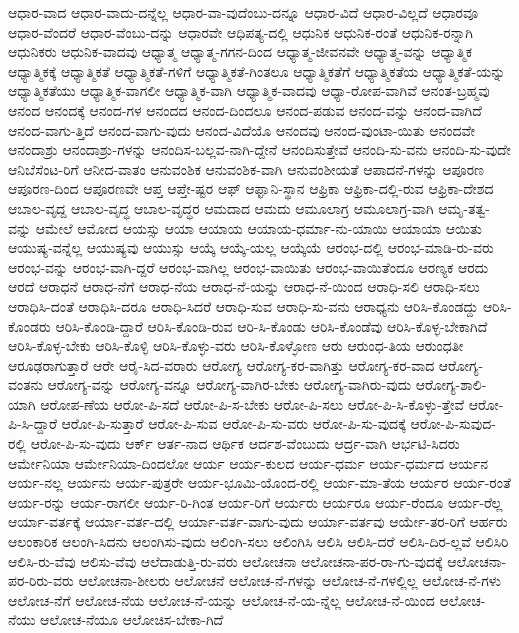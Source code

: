 {ಆಧಾರ-ವಾದ
ಆಧಾರ-ವಾದು-ದನ್ನೆಲ್ಲ
ಆಧಾರ-ವಾ-ವುದೆಂಬು-ದನ್ನೂ
ಆಧಾರ-ವಿದೆ
ಆಧಾರ-ವಿಲ್ಲದೆ
ಆಧಾರವೂ
ಆಧಾರ-ವೆಂದರೆ
ಆಧಾರ-ವೆಂಬು-ದನ್ನು
ಆಧಾರವೇ
ಆಧಿಪತ್ಯ-ದಲ್ಲಿ
ಆಧುನಿಕ
ಆಧುನಿಕ-ರಂತೆ
ಆಧುನಿಕ-ರನ್ನಾಗಿ
ಆಧುನಿಕರು
ಆಧುನಿಕ-ವಾದವು
ಆಧ್ಯಾತ್ಮ
ಆಧ್ಯಾತ್ಮ-ಗಗನ-ದಿಂದ
ಆಧ್ಯಾತ್ಮ-ಜೀವನವೇ
ಆಧ್ಯಾತ್ಮ-ವನ್ನು
ಆಧ್ಯಾತ್ಮಿಕ
ಆಧ್ಯಾತ್ಮಿಕಕ್ಕೆ
ಆಧ್ಯಾತ್ಮಿಕತೆ
ಆಧ್ಯಾತ್ಮಿಕತೆ-ಗಳಿಗೆ
ಆಧ್ಯಾತ್ಮಿಕತೆ-ಗಿಂತಲೂ
ಆಧ್ಯಾತ್ಮಿಕತೆಗೆ
ಆಧ್ಯಾತ್ಮಿಕತೆಯ
ಆಧ್ಯಾತ್ಮಿಕತೆ-ಯನ್ನು
ಆಧ್ಯಾತ್ಮಿಕತೆಯು
ಆಧ್ಯಾತ್ಮಿಕ-ವಾಗಲೀ
ಆಧ್ಯಾತ್ಮಿಕ-ವಾಗಿ
ಆಧ್ಯಾತ್ಮಿಕ-ವಾದವು
ಆಧ್ಯಾ-ರೋಪ-ವಾಗಿವೆ
ಆನಂತ-ಬ್ರಹ್ಮವು
ಆನಂದ
ಆನಂದಕ್ಕೆ
ಆನಂದ-ಗಳ
ಆನಂದದ
ಆನಂದ-ದಿಂದಲೂ
ಆನಂದ-ಪಡುವ
ಆನಂದ-ವನ್ನು
ಆನಂದ-ವಾಗಿದೆ
ಆನಂದ-ವಾಗು-ತ್ತಿದೆ
ಆನಂದ-ವಾಗು-ವುದು
ಆನಂದ-ವಿದೆಯೊ
ಆನಂದವು
ಆನಂದ-ವುಂಟಾ-ಯಿತು
ಆನಂದವೇ
ಆನಂದಾಶ್ರು
ಆನಂದಾಶ್ರು-ಗಳನ್ನು
ಆನಂದಿಸ-ಬಲ್ಲವ-ನಾಗಿ-ದ್ದೇನೆ
ಆನಂದಿಸುತ್ತೇವೆ
ಆನಂದಿ-ಸು-ವನು
ಆನಂದಿ-ಸು-ವುದೇ
ಆನಿಬೆಸೆಂಟ-ರಿಗೆ
ಆನೀದ-ವಾತಂ
ಆನುವಂಶಿಕ
ಆನುವಂಶಿಕ-ವಾಗಿ
ಆನುವಂಶೀಯತೆ
ಆಪಾದನೆ-ಗಳನ್ನು
ಆಪೂರಣ
ಆಪೂರಣ-ದಿಂದ
ಆಪೂರಣವೇ
ಆಪ್ತ
ಆಪ್ತೇ-ಷ್ಟರ
ಆಫ್
ಆಫ್ಘಾನಿ-ಸ್ಥಾನ
ಆಫ್ರಿಕಾ
ಆಫ್ರಿಕಾ-ದಲ್ಲಿ-ರುವ
ಆಫ್ರಿಕಾ-ದೇಶದ
ಆಬಾಲ-ವೃದ್ದ
ಆಬಾಲ-ವೃದ್ಧ
ಆಬಾಲ-ವೃದ್ಧರ
ಆಮದಾದ
ಆಮದು
ಆಮೂಲಾಗ್ರ
ಆಮೂಲಾಗ್ರ-ವಾಗಿ
ಆಮೃ-ತತ್ವ-ವನ್ನು
ಆಮೇಲೆ
ಆಮೋದ
ಆಯಸ್ಸು
ಆಯಾ
ಆಯಾಯ
ಆಯಾಯ-ಧರ್ಮಾ-ನು-ಯಾಯಿ
ಆಯಾಯಾ
ಆಯಿತು
ಆಯುಷ್ಯ-ವನ್ನೆಲ್ಲ
ಆಯುಷ್ಯವು
ಆಯುಸ್ಸು
ಆಯ್ಕೆ
ಆಯ್ಕೆ-ಯಲ್ಲ
ಆಯ್ಕೆಯೆ
ಆರಂಭ-ದಲ್ಲಿ
ಆರಂಭ-ಮಾಡಿ-ರು-ವರು
ಆರಂಭ-ವನ್ನು
ಆರಂಭ-ವಾಗಿ-ದ್ದರೆ
ಆರಂಭ-ವಾಗಿಲ್ಲ
ಆರಂಭ-ವಾಯಿತು
ಆರಂಭ-ವಾಯಿತೆಂದೂ
ಆರಣ್ಯಕ
ಆರದು
ಆರದೆ
ಆರಾಧನೆ
ಆರಾಧ-ನೆಗೆ
ಆರಾಧ-ನೆಯ
ಆರಾಧ-ನೆ-ಯನ್ನು
ಆರಾಧ-ನೆ-ಯಿಂದ
ಆರಾಧಿ-ಸಲಿ
ಆರಾಧಿ-ಸಲು
ಆರಾಧಿಸಿ-ದಂತೆ
ಆರಾಧಿಸಿ-ದರೂ
ಆರಾಧಿ-ಸಿದರೆ
ಆರಾಧಿ-ಸುವ
ಆರಾಧಿ-ಸು-ವನು
ಆರಾಧ್ಯನು
ಆರಿಸಿ-ಕೊಂಡದ್ದು
ಆರಿಸಿ-ಕೊಂಡರು
ಆರಿಸಿ-ಕೊಂಡಿ-ದ್ದಾರೆ
ಆರಿಸಿ-ಕೊಂಡಿ-ರುವ
ಆರಿ-ಸಿ-ಕೊಂಡು
ಆರಿಸಿ-ಕೊಂಡೆವು
ಆರಿಸಿ-ಕೊಳ್ಳ-ಬೇಕಾಗಿದೆ
ಆರಿಸಿ-ಕೊಳ್ಳ-ಬೇಕು
ಆರಿಸಿ-ಕೊಳ್ಳಿ
ಆರಿಸಿ-ಕೊಳ್ಳು-ವರು
ಆರಿಸಿ-ಕೊಳ್ಳೋಣ
ಆರು
ಆರುಂಧ-ತಿಯ
ಆರುಂಧತೀ
ಆರೂಢರಾಗುತ್ತಾರೆ
ಆರೇ
ಆರೈ-ಸಿದ-ವರಾರು
ಆರೋಗ್ಯ
ಆರೋಗ್ಯ-ಕರ-ವಾಗಿತ್ತು
ಆರೋಗ್ಯ-ಕರ-ವಾದ
ಆರೋಗ್ಯ-ವಂತನು
ಆರೋಗ್ಯ-ವನ್ನು
ಆರೋಗ್ಯ-ವನ್ನೂ
ಆರೋಗ್ಯ-ವಾಗಿರ-ಬೇಕು
ಆರೋಗ್ಯ-ವಾಗಿರು-ವುದು
ಆರೋಗ್ಯ-ಶಾಲಿ-ಯಾಗಿ
ಆರೋಪ-ಣೆಯ
ಆರೋ-ಪಿ-ಸದೆ
ಆರೋ-ಪಿ-ಸ-ಬೇಕು
ಆರೋ-ಪಿ-ಸಲು
ಆರೋ-ಪಿ-ಸಿ-ಕೊಳ್ಳು-ತ್ತೇವೆ
ಆರೋ-ಪಿ-ಸಿ-ದ್ದಾರೆ
ಆರೋ-ಪಿ-ಸುತ್ತಾರೆ
ಆರೋ-ಪಿ-ಸುವ
ಆರೋ-ಪಿ-ಸು-ವರು
ಆರೋ-ಪಿ-ಸು-ವುದಕ್ಕೆ
ಆರೋ-ಪಿ-ಸುವುದ-ರಲ್ಲಿ
ಆರೋ-ಪಿ-ಸು-ವುದು
ಆರ್ಕ್
ಆರ್ತ-ನಾದ
ಆರ್ಥಿಕ
ಆರ್ದಶ-ವೆಂಬುದು
ಆರ್ದ್ರ-ವಾಗಿ
ಆರ್ಭಟಿ-ಸಿದರು
ಆರ್ಮೇನಿಯಾ
ಆರ್ಮೇನಿಯಾ-ದಿಂದಲೋ
ಆರ್ಯ
ಆರ್ಯ-ಕುಲದ
ಆರ್ಯ-ಧರ್ಮ
ಆರ್ಯ-ಧರ್ಮದ
ಆರ್ಯನ
ಆರ್ಯ-ನಲ್ಲ
ಆರ್ಯನು
ಆರ್ಯ-ಪುತ್ರರೇ
ಆರ್ಯ-ಭೂಮಿ-ಯೊಂದ-ರಲ್ಲಿ
ಆರ್ಯ-ಮಾ-ತೆಯ
ಆರ್ಯರ
ಆರ್ಯ-ರಂತೆ
ಆರ್ಯ-ರನ್ನು
ಆರ್ಯ-ರಾಗಲೀ
ಆರ್ಯ-ರಿ-ಗಿಂತ
ಆರ್ಯ-ರಿಗೆ
ಆರ್ಯರು
ಆರ್ಯರೂ
ಆರ್ಯ-ರೆಂದೂ
ಆರ್ಯ-ರೆಲ್ಲ
ಆರ್ಯಾ-ವರ್ತಕ್ಕೆ
ಆರ್ಯಾ-ವರ್ತ-ದಲ್ಲಿ
ಆರ್ಯಾ-ವರ್ತ-ವಾಗು-ವುದು
ಆರ್ಯಾ-ವರ್ತವು
ಆರ್ಯೇ-ತರ-ರಿಗೆ
ಆರ್ಹರು
ಆಲಂಕಾರಿಕ
ಆಲಂಗಿ-ಸಿದನು
ಆಲಂಗಿಸು-ವುದು
ಆಲಿಂಗಿ-ಸಲು
ಆಲಿಂಗಿಸಿ
ಆಲಿಸಿ
ಆಲಿಸಿ-ದರೆ
ಆಲಿಸಿ-ದಿರ-ಲ್ಲವೆ
ಆಲಿಸಿರಿ
ಆಲಿಸಿ-ರು-ವೆವು
ಆಲಿಸು-ವೆವು
ಆಲೆದಾಡುತ್ತಿ-ರು-ವರು
ಆಲೋಚನಾ
ಆಲೋಚನಾ-ಪರ-ರಾ-ಗು-ವುದಕ್ಕೆ
ಆಲೋಚನಾ-ಪರ-ರಿರು-ವರು
ಆಲೋಚನಾ-ಶೀಲರು
ಆಲೋಚನೆ
ಆಲೋಚ-ನೆ-ಗಳನ್ನು
ಆಲೋಚ-ನೆ-ಗಳಲ್ಲಿಲ್ಲ
ಆಲೋಚ-ನೆ-ಗಳು
ಆಲೋಚ-ನೆಗೆ
ಆಲೋಚ-ನೆಯ
ಆಲೋಚ-ನೆ-ಯನ್ನು
ಆಲೋಚ-ನೆ-ಯ-ನ್ನೆಲ್ಲ
ಆಲೋಚ-ನೆ-ಯಿಂದ
ಆಲೋಚ-ನೆಯು
ಆಲೋಚ-ನೆಯೂ
ಆಲೋಚಿಸ-ಬೇಕಾ-ಗಿದೆ
}
